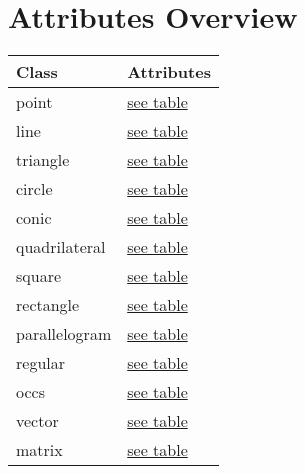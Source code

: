 \documentclass[
  DIV=14,
  fontsize=10,
  index=totoc,
  twoside,
  cadre,
  headings=small
]{tkz-doc}
\begin{document}
\clearpage
\listofoverviews

\clearpage
\section*{Attributes Overview}
\begin{tabular}{ll}
\textbf{Class} & \textbf{Attributes} \\
\hline
point & \hyperref[point:attributes]{see table}       \\
line & \hyperref[line:attributes]{see table}         \\
triangle & \hyperref[triangle:attributes]{see table} \\
circle & \hyperref[circle:attributes]{see table}     \\
conic & \hyperref[conic:attributes]{see table}       \\
quadrilateral & \hyperref[quadrilateral:attributes]{see table}\\
square & \hyperref[square:attributes]{see table}     \\
rectangle & \hyperref[rectangle:attributes]{see table}\\
parallelogram & \hyperref[parallelogram:attributes]{see table}\\
regular & \hyperref[regular:attributes]{see table}   \\
occs & \hyperref[occs:attributes]{see table}         \\
vector & \hyperref[vector:attributes]{see table}     \\
matrix & \hyperref[matrix:attributes]{see table}     \\
\end{tabular}
\end{document}
